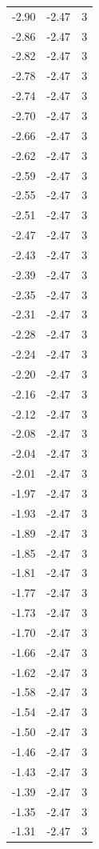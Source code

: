 \begin{longtable}{lrr}
  -2.90 & -2.47 & 3 \\
  -2.86 & -2.47 & 3 \\
  -2.82 & -2.47 & 3 \\
  -2.78 & -2.47 & 3 \\
  -2.74 & -2.47 & 3 \\
  -2.70 & -2.47 & 3 \\
  -2.66 & -2.47 & 3 \\
  -2.62 & -2.47 & 3 \\
  -2.59 & -2.47 & 3 \\
  -2.55 & -2.47 & 3 \\
  -2.51 & -2.47 & 3 \\
  -2.47 & -2.47 & 3 \\
  -2.43 & -2.47 & 3 \\
  -2.39 & -2.47 & 3 \\
  -2.35 & -2.47 & 3 \\
  -2.31 & -2.47 & 3 \\
  -2.28 & -2.47 & 3 \\
  -2.24 & -2.47 & 3 \\
  -2.20 & -2.47 & 3 \\
  -2.16 & -2.47 & 3 \\
  -2.12 & -2.47 & 3 \\
  -2.08 & -2.47 & 3 \\
  -2.04 & -2.47 & 3 \\
  -2.01 & -2.47 & 3 \\
  -1.97 & -2.47 & 3 \\
  -1.93 & -2.47 & 3 \\
  -1.89 & -2.47 & 3 \\
  -1.85 & -2.47 & 3 \\
  -1.81 & -2.47 & 3 \\
  -1.77 & -2.47 & 3 \\
  -1.73 & -2.47 & 3 \\
  -1.70 & -2.47 & 3 \\
  -1.66 & -2.47 & 3 \\
  -1.62 & -2.47 & 3 \\
  -1.58 & -2.47 & 3 \\
  -1.54 & -2.47 & 3 \\
  -1.50 & -2.47 & 3 \\
  -1.46 & -2.47 & 3 \\
  -1.43 & -2.47 & 3 \\
  -1.39 & -2.47 & 3 \\
  -1.35 & -2.47 & 3 \\
  -1.31 & -2.47 & 3 \\

\end{longtable}
